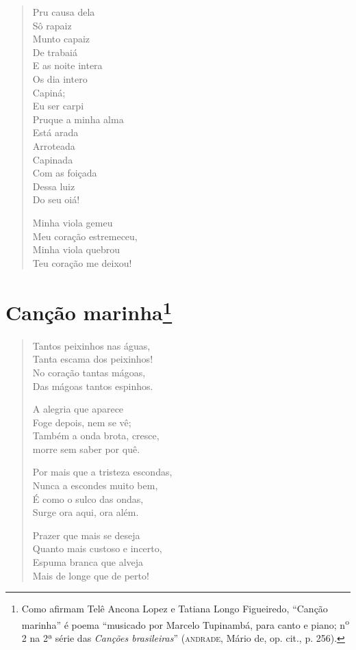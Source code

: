 {\begin{verse}
Pru causa dela\\
Sô rapaiz\\
Munto capaiz\\
De trabaiá\\
E as noite intera\\
Os dia intero\\
Capiná;\\
Eu ser carpi\\
Pruque a minha alma\\
Está arada\\
Arroteada\\
Capinada\\
Com as foiçada\\
Dessa luiz\\
Do seu oiá!

Minha viola gemeu\\
Meu coração estremeceu,\\
Minha viola quebrou\\
Teu coração me deixou!
\end{verse}

\chapter{Canção marinha\footnote[*]{Como afirmam Telê Ancona Lopez e
  Tatiana Longo Figueiredo, ``Canção marinha'' é poema ``musicado por
  Marcelo Tupinambá, para canto e piano; n\textsuperscript{o} 2 na 2ª
  série das \emph{Canções brasileiras}'' (\textsc{andrade}, Mário de, op. cit.,
  p. 256).}}

\begin{verse}
Tantos peixinhos nas águas,\\
Tanta escama dos peixinhos!\\
No coração tantas mágoas,\\
Das mágoas tantos espinhos.

A alegria que aparece\\
Foge depois, nem se vê;\\
Também a onda brota, cresce,\\
morre sem saber por quê.

Por mais que a tristeza escondas,\\
Nunca a escondes muito bem,\\
É como o sulco das ondas,\\
Surge ora aqui, ora além.

Prazer que mais se deseja\\
Quanto mais custoso e incerto,\\
Espuma branca que alveja\\
Mais de longe que de perto!


\end{verse}}
